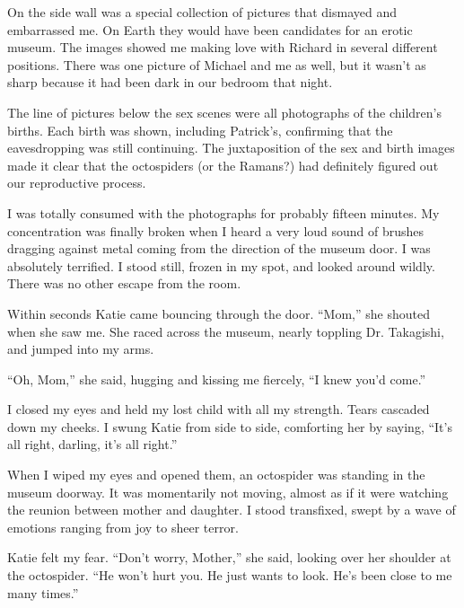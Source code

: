 \documentclass[]{article}
\begin{document}
On the side wall was a special collection of pictures that dismayed and embarrassed me. On Earth they would have been candidates for an erotic museum. The images showed me making love with Richard in several different positions. There was one picture of Michael and me as well, but it wasn’t as sharp because it had been dark in our bedroom that night.

The line of pictures below the sex scenes were all photographs of the children’s births. Each birth was shown, including Patrick’s, confirming that the eavesdropping was still continuing. The juxtaposition of the sex and birth images made it clear that the octospiders (or the Ramans?) had definitely figured out our reproductive process.

I was totally consumed with the photographs for probably fifteen minutes. My concentration was finally broken when I heard a very loud sound of brushes dragging against metal coming from the direction of the museum door. I was absolutely terrified. I stood still, frozen in my spot, and looked around wildly. There was no other escape from the room.

Within seconds Katie came bouncing through the door. “Mom,” she shouted when she saw me. She raced across the museum, nearly toppling Dr. Takagishi, and jumped into my arms.

“Oh, Mom,” she said, hugging and kissing me fiercely, “I knew you’d come.”

I closed my eyes and held my lost child with all my strength. Tears cascaded down my cheeks. I swung Katie from side to side, comforting her by saying, “It’s all right, darling, it’s all right.”

When I wiped my eyes and opened them, an octospider was standing in the museum doorway. It was momentarily not moving, almost as if it were watching the reunion between mother and daughter. I stood transfixed, swept by a wave of emotions ranging from joy to sheer terror.

Katie felt my fear. “Don’t worry, Mother,” she said, looking over her shoulder at the octospider. “He won’t hurt you. He just wants to look. He’s been close to me many times.”
\end{document}

